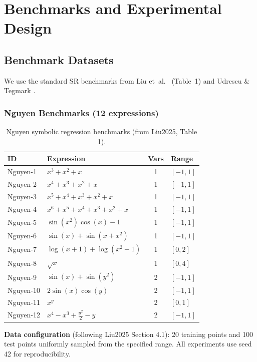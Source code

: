 \section{Benchmarks and Experimental Design}
\label{sec:benchmarks}

\subsection{Benchmark Datasets}

We use the standard SR benchmarks from Liu et~al.\ \cite{liu2025} (Table~1)
and Udrescu \& Tegmark \cite{udrescu2020}.

\subsubsection{Nguyen Benchmarks (12 expressions)}

\begin{table}[h]
\centering
\caption{Nguyen symbolic regression benchmarks (from Liu2025, Table 1).}
\label{tab:nguyen}
\begin{tabular}{llcl}
\toprule
ID & Expression & Vars & Range \\
\midrule
Nguyen-1  & $x^3 + x^2 + x$ & 1 & $[-1, 1]$ \\
Nguyen-2  & $x^4 + x^3 + x^2 + x$ & 1 & $[-1, 1]$ \\
Nguyen-3  & $x^5 + x^4 + x^3 + x^2 + x$ & 1 & $[-1, 1]$ \\
Nguyen-4  & $x^6 + x^5 + x^4 + x^3 + x^2 + x$ & 1 & $[-1, 1]$ \\
Nguyen-5  & $\sin(x^2)\cos(x) - 1$ & 1 & $[-1, 1]$ \\
Nguyen-6  & $\sin(x) + \sin(x + x^2)$ & 1 & $[-1, 1]$ \\
Nguyen-7  & $\log(x+1) + \log(x^2+1)$ & 1 & $[0, 2]$ \\
Nguyen-8  & $\sqrt{x}$ & 1 & $[0, 4]$ \\
Nguyen-9  & $\sin(x) + \sin(y^2)$ & 2 & $[-1, 1]$ \\
Nguyen-10 & $2\sin(x)\cos(y)$ & 2 & $[-1, 1]$ \\
Nguyen-11 & $x^y$ & 2 & $[0, 1]$ \\
Nguyen-12 & $x^4 - x^3 + \frac{y^2}{2} - y$ & 2 & $[-1, 1]$ \\
\bottomrule
\end{tabular}
\end{table}

\textbf{Data configuration} (following Liu2025 Section 4.1): 20 training
points and 100 test points uniformly sampled from the specified range.
All experiments use seed 42 for reproducibility.

